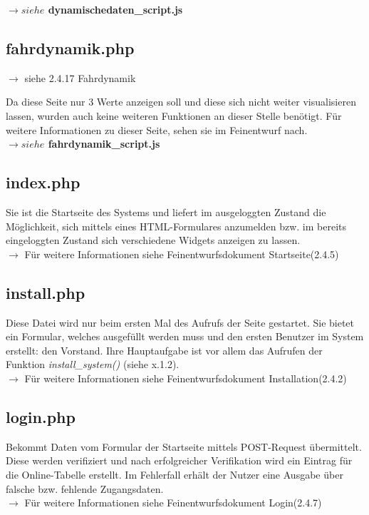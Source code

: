 \documentclass[fontsize = 12pt, paper = a4]{scrreprt}
\begin{document}
\textbf{$\rightarrow siehe$ dynamischedaten\_script.js}\\

\subsection{fahrdynamik.php}
$\rightarrow$ siehe 2.4.17 Fahrdynamik

Da diese Seite nur 3 Werte anzeigen soll und diese sich nicht weiter visualisieren lassen, wurden auch keine weiteren Funktionen an dieser Stelle benötigt. Für weitere Informationen zu dieser Seite, sehen sie im Feinentwurf nach.\\

\textbf{$\rightarrow siehe$ fahrdynamik\_script.js}\\

\subsection{index.php}
Sie ist die Startseite des Systems und liefert im ausgeloggten Zustand die Möglichkeit, sich mittels eines HTML-Formulares anzumelden bzw. im bereits eingeloggten Zustand sich verschiedene Widgets anzeigen zu lassen.\\
$\rightarrow$ Für weitere Informationen siehe Feinentwurfsdokument \glqq Startseite\grqq (2.4.5)

\subsection{install.php}
Diese Datei wird nur beim ersten Mal des Aufrufs der Seite gestartet. Sie bietet ein Formular, welches ausgefüllt werden muss und den ersten Benutzer im System erstellt: den Vorstand. Ihre Hauptaufgabe ist vor allem das Aufrufen der Funktion \textit{install\_system()} (siehe x.1.2).\\
$\rightarrow$ Für weitere Informationen siehe Feinentwurfsdokument \glqq Installation\grqq (2.4.2)

\subsection{login.php}
Bekommt Daten vom Formular der Startseite mittels POST-Request übermittelt. Diese werden verifiziert und nach erfolgreicher Verifikation wird ein Eintrag für die Online-Tabelle erstellt. Im Fehlerfall erhält der Nutzer eine Ausgabe über falsche bzw. fehlende Zugangsdaten. \\
$\rightarrow$ Für weitere Informationen siehe Feinentwurfsdokument \glqq Login\grqq(2.4.7)
\end{document}
